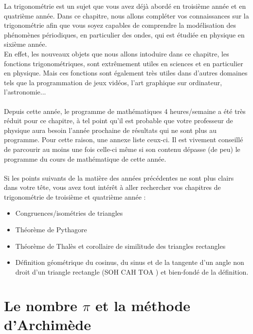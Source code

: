 \documentclass[a4paper,fontsize=13pt]{scrreprt}
\theoremstyle{plain}
\theoremstyle{definition}
\begin{document}
La trigonométrie est un sujet que vous avez déjà abordé en troisième année et en quatrième année. Dans ce chapitre, nous allons compléter vos connaissances sur la trigonométrie afin que vous soyez capables de comprendre la modélisation des phénomènes périodiques, en particulier des ondes, qui est étudiée en physique en sixième année. \\
En effet, les nouveaux objets que nous allons intoduire dans ce chapitre, les fonctions trigonométriques, sont extrêmement utiles en sciences et en particulier en physique. Mais ces fonctions sont également très utiles dans d'autres domaines tels que la programmation de jeux vidéos, l'art graphique sur ordinateur, l'astronomie... \\
~\\
Depuis cette année, le programme de mathématiques 4 heures/semaine a été très réduit pour ce chapitre, à tel point qu'il est probable que votre professeur de physique aura besoin l'année prochaine de résultats qui ne sont plus au programme. Pour cette raison, une annexe liste ceux-ci. Il est vivement conseillé de parcourir au moins une fois celle-ci même si son contenu dépasse (de peu) le programme du cours de mathématique de cette année.\\
~\\
Si les points suivants de la matière des années précédentes ne sont plus clairs dans votre tête, vous avez tout intérêt à aller rechercher vos chapitres de trigonométrie de troisième et quatrième année :
\begin{itemize}
\item Congruences/isométries de triangles
\item Théorème de Pythagore
\item Théorème de Thalès et corollaire de similitude des triangles rectangles
\item Définition géométrique du cosinus, du sinus et de la tangente d'un angle non droit d'un triangle rectangle (\og SOH CAH TOA \fg{}) et bien-fondé de la définition.
\end{itemize}

\chapter{Le nombre $\pi$ et la méthode d'Archimède}
\end{document}
